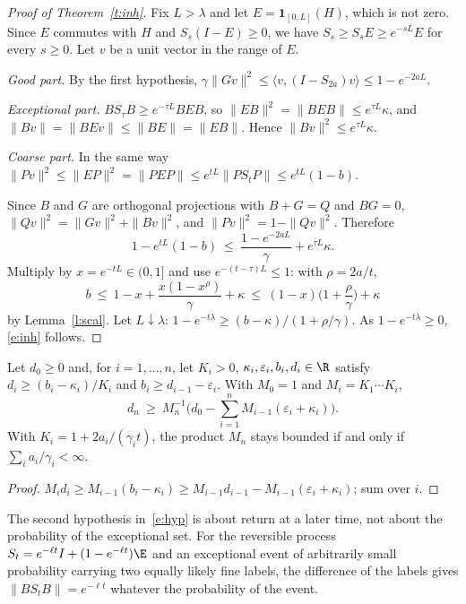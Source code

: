 \begin{proof}[Proof of Theorem~\ref{t:inh}]
Fix $L>\lambda$ and let $E=\mathbf 1_{[0,L]}(H)$, which is not zero. Since $E$ commutes with $H$ and
$S_s(I-E)\ge0$, we have $S_s\ge S_sE\ge e^{-sL}E$ for every $s\ge0$. Let $v$ be a unit vector in the range of
$E$.

\emph{Good part.} By the first hypothesis, $\gamma\|Gv\|^2\le\langle v,(I-S_{2a})v\rangle\le1-e^{-2aL}$.

\emph{Exceptional part.} $BS_\tau B\ge e^{-\tau L}BEB$, so $\|EB\|^2=\|BEB\|\le e^{\tau L}\kappa$, and
$\|Bv\|=\|BEv\|\le\|BE\|=\|EB\|$. Hence $\|Bv\|^2\le e^{\tau L}\kappa$.

\emph{Coarse part.} In the same way $\|Pv\|^2\le\|EP\|^2=\|PEP\|\le e^{tL}\|PS_tP\|\le e^{tL}(1-b)$.

Since $B$ and $G$ are orthogonal projections with $B+G=Q$ and $BG=0$, $\|Qv\|^2=\|Gv\|^2+\|Bv\|^2$, and
$\|Pv\|^2=1-\|Qv\|^2$. Therefore
\[
1-e^{tL}(1-b)\ \le\ \frac{1-e^{-2aL}}{\gamma}+e^{\tau L}\kappa .
\]
Multiply by $x=e^{-tL}\in(0,1]$ and use $e^{-(t-\tau)L}\le1$: with $\rho=2a/t$,
\[
b\ \le\ 1-x+\frac{x(1-x^{\rho})}{\gamma}+\kappa\ \le\ (1-x)\Big(1+\frac{\rho}{\gamma}\Big)+\kappa
\]
by Lemma~\ref{l:scal}. Let $L\downarrow\lambda$: $1-e^{-t\lambda}\ge(b-\kappa)/(1+\rho/\gamma)$. As
$1-e^{-t\lambda}\ge0$, \eqref{e:inh} follows.
\end{proof}

\begin{corollary}[Accumulation]\label{c:acc}
Let $d_0\ge0$ and, for $i=1,\dots,n$, let $K_i>0$, $\kappa_i,\varepsilon_i,b_i,d_i\in\R$ satisfy
$d_i\ge(b_i-\kappa_i)/K_i$ and $b_i\ge d_{i-1}-\varepsilon_i$. With $M_0=1$ and $M_i=K_1\cdots K_i$,
\[
d_n\ \ge\ M_n^{-1}\Big(d_0-\sum_{i=1}^nM_{i-1}(\varepsilon_i+\kappa_i)\Big).
\]
With $K_i=1+2a_i/(\gamma_it)$, the product $M_n$ stays bounded if and only if $\sum_ia_i/\gamma_i<\infty$.
\end{corollary}
\begin{proof}
$M_id_i\ge M_{i-1}(b_i-\kappa_i)\ge M_{i-1}d_{i-1}-M_{i-1}(\varepsilon_i+\kappa_i)$; sum over $i$.
\end{proof}

\begin{remark}\label{r:reset}
The second hypothesis in~\eqref{e:hyp} is about return at a later time, not about the probability of the
exceptional set. For the reversible process $S_t=e^{-\ell t}I+(1-e^{-\ell t})\E$ and an exceptional event of
arbitrarily small probability carrying two equally likely fine labels, the difference of the labels gives
$\|BS_tB\|=e^{-\ell t}$ whatever the probability of the event.
\end{remark}

